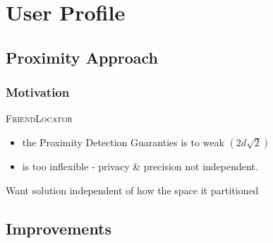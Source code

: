 \section{User Profile}

\subsection{Proximity Approach}

\begin{frame}[red] %
\frametitle{Motivation}
\textsc{FriendLocator}
\begin{itemize}
	\item the Proximity Detection Guaranties is to weak $(2d\sqrt{2})$
	\item is too inflexible - privacy \& precision not independent.
\end{itemize}

\vspace{2em}

Want solution independent of how the space it partitioned
\end{frame}

\subsection{Improvements}

